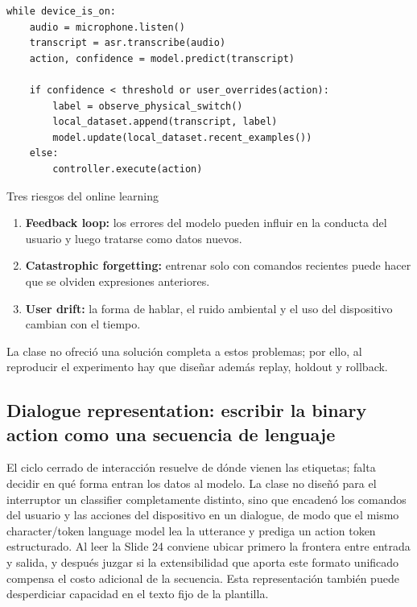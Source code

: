 
\begin{lstlisting}[caption={Máquina de estados del aprendizaje interactivo del interruptor de voz local}]
while device_is_on:
    audio = microphone.listen()
    transcript = asr.transcribe(audio)
    action, confidence = model.predict(transcript)

    if confidence < threshold or user_overrides(action):
        label = observe_physical_switch()
        local_dataset.append(transcript, label)
        model.update(local_dataset.recent_examples())
    else:
        controller.execute(action)
\end{lstlisting}

\begin{knowledgebox}{Tres riesgos del online learning}
\begin{enumerate}
  \item \textbf{Feedback loop:} los errores del modelo pueden influir en la conducta del usuario y luego tratarse como datos nuevos.
  \item \textbf{Catastrophic forgetting:} entrenar solo con comandos recientes puede hacer que se olviden expresiones anteriores.
  \item \textbf{User drift:} la forma de hablar, el ruido ambiental y el uso del dispositivo cambian con el tiempo.
\end{enumerate}
La clase no ofreció una solución completa a estos problemas; por ello, al reproducir el experimento hay que diseñar además replay, holdout y rollback.
\end{knowledgebox}


\subsection{Dialogue representation: escribir la binary action como una secuencia de lenguaje}

El ciclo cerrado de interacción resuelve de dónde vienen las etiquetas; falta decidir en qué forma entran los datos al modelo. La clase no diseñó para el interruptor un classifier completamente distinto, sino que encadenó los comandos del usuario y las acciones del dispositivo en un dialogue, de modo que el mismo character/token language model lea la utterance y prediga un action token estructurado. Al leer la Slide 24 conviene ubicar primero la frontera entre entrada y salida, y después juzgar si la extensibilidad que aporta este formato unificado compensa el costo adicional de la secuencia. Esta representación también puede desperdiciar capacidad en el texto fijo de la plantilla.

